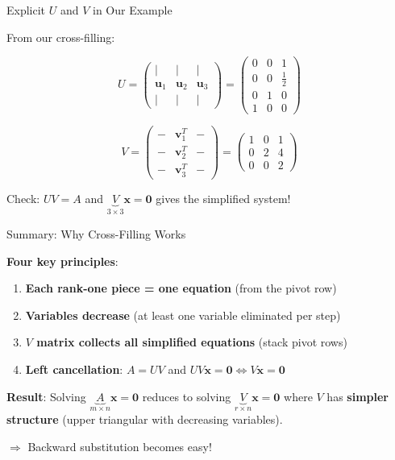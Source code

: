 \documentclass[10pt]{beamer}
\theoremstyle{definition}
\newcommand{\x}[1]{\alert{\textbf{#1}}}
\begin{document}
\begin{frame}{Explicit $U$ and $V$ in Our Example}

From our cross-filling:

$$U = \begin{pmatrix}
| & | & | \\
\mathbf{u}_1 & \mathbf{u}_2 & \mathbf{u}_3 \\
| & | & |
\end{pmatrix} = \begin{pmatrix}
0 & 0 & 1 \\
0 & 0 & \frac{1}{2} \\
0 & 1 & 0 \\
1 & 0 & 0
\end{pmatrix}$$

$$V = \begin{pmatrix}
- & \mathbf{v}_1^T & - \\
- & \mathbf{v}_2^T & - \\
- & \mathbf{v}_3^T & -
\end{pmatrix} = \begin{pmatrix}
1 & 0 & 1 \\
0 & 2 & 4 \\
0 & 0 & 2
\end{pmatrix}$$

\vspace{0.5em}

Check: $UV = A$ and $\underbrace{V}_{3 \times 3} \mathbf{x} = \mathbf{0}$ gives the simplified system!

\end{frame}

\begin{frame}{Summary: Why Cross-Filling Works}

\x{Four key principles}:

\begin{enumerate}
\item \textbf{Each rank-one piece = one equation} (from the pivot row)
\item \textbf{Variables decrease} (at least one variable eliminated per step)
\item \textbf{$V$ matrix collects all simplified equations} (stack pivot rows)
\item \textbf{Left cancellation}: $A = UV$ and $UV\mathbf{x} = \mathbf{0} \iff V\mathbf{x} = \mathbf{0}$
\end{enumerate}

\vspace{1em}

\x{Result}: Solving $\underbrace{A}_{m \times n}\mathbf{x} = \mathbf{0}$ reduces to solving $\underbrace{V}_{r \times n}\mathbf{x} = \mathbf{0}$ where $V$ has \textbf{simpler structure} (upper triangular with decreasing variables).

\vspace{0.5em}

$\Rightarrow$ Backward substitution becomes easy!

\end{frame}
\end{document}
